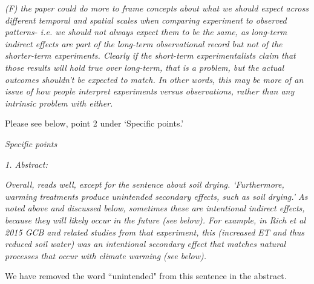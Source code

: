 \documentclass[11pt,a4paper]{letter}
\begin{document}
\begin{letter}{}
\par \emph{(F) the paper could do more to frame concepts about what we should expect across different temporal and spatial scales when comparing experiment to observed patterns- i.e. we should not always expect them to be the same, as long-term indirect effects are part of the long-term observational record but not of the shorter-term experiments. Clearly if the short-term experimentalists claim that those results will hold true over long-term, that is a problem, but the actual outcomes shouldn't be expected to match. In other words, this may be more of an issue of how people interpret experiments versus observations, rather than any intrinsic problem with either.}

\par Please see below, point 2 under `Specific points.'

\emph{Specific points}
\\
\par \emph{1. Abstract:}
\par \emph{Overall, reads well, except for the sentence about soil drying. `Furthermore, warming treatments produce unintended secondary effects, such as soil drying.' As noted above and discussed below, sometimes these are intentional indirect effects, because they will likely occur in the future (see below). For example, in Rich et al 2015 GCB and related studies from that experiment, this (increased ET and thus reduced soil water) was an intentional secondary effect that matches natural processes that occur with climate warming (see below).}

\par We have removed the word ``unintended"  from this sentence in the abstract.
\\


\end{letter}
\end{document}

